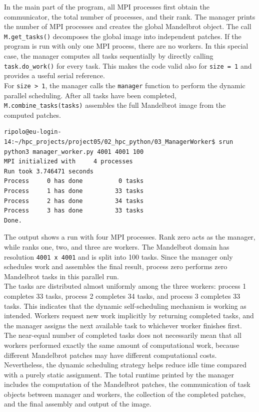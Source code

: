 \documentclass[unicode,10pt,a4paper,oneside,numbers=endperiod,openany]{scrartcl}
\begin{document}
In the main part of the program, all MPI processes first obtain the communicator, the total number of
processes, and their rank. The manager prints the number of MPI processes and creates the global
Mandelbrot object. The call \texttt{M.get\_tasks()} decomposes the global image into independent
patches. If the program is run with only one MPI process, there are no workers. In this special case,
the manager computes all tasks sequentially by directly calling \texttt{task.do\_work()} for every task.
This makes the code valid also for \texttt{size = 1} and provides a useful serial reference.\\
For \texttt{size > 1}, the manager calls the \texttt{manager} function to perform the dynamic parallel
scheduling. After all tasks have been completed, \texttt{M.combine\_tasks(tasks)} assembles the full
Mandelbrot image from the computed patches.
\begin{lstlisting}[style=grayverbatim,label={lst:mandelbrot_manager_worker_output},caption={Output of the manager-worker pattern for computing the Mandelbrot set in parallel}]
ripolo@eu-login-14:~/hpc_projects/project05/02_hpc_python/03_ManagerWorker$ srun python3 manager_worker.py 4001 4001 100
MPI initialized with     4 processes
Run took 3.746471 seconds
Process     0 has done          0 tasks
Process     1 has done         33 tasks
Process     2 has done         34 tasks
Process     3 has done         33 tasks
Done.
\end{lstlisting}
The output shows a run with four MPI processes. Rank zero acts as the manager, while ranks one, two,
and three are workers. The Mandelbrot domain has resolution \texttt{4001 x 4001} and is split into
100 tasks. Since the manager only schedules work and assembles the final result, process zero performs
zero Mandelbrot tasks in this parallel run.\\
The tasks are distributed almost uniformly among the three workers: process 1 completes 33 tasks,
process 2 completes 34 tasks, and process 3 completes 33 tasks. This indicates that the dynamic
self-scheduling mechanism is working as intended. Workers request new work implicitly by returning
completed tasks, and the manager assigns the next available task to whichever worker finishes first.\\

The near-equal number of completed tasks does not necessarily mean that all workers performed exactly
the same amount of computational work, because different Mandelbrot patches may have different
computational costs. Nevertheless, the dynamic scheduling strategy helps reduce idle time compared
with a purely static assignment. The total runtime printed by the manager includes the computation of
the Mandelbrot patches, the communication of task objects between manager and workers, the
collection of the completed patches, and the final assembly and output of the image.
\end{document}

